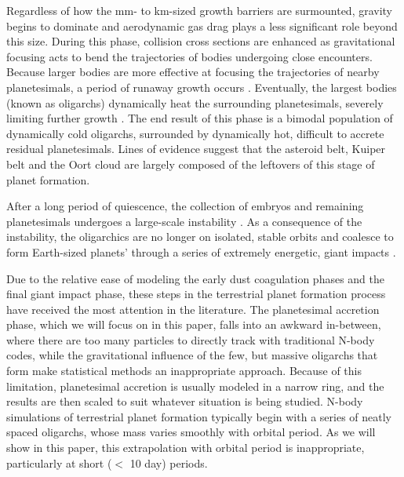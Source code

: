 \documentclass[twocolumn]{aastex63}
\begin{document}
Regardless of how the mm- to km-sized growth barriers are surmounted, gravity begins to dominate and aerodynamic gas drag plays a less significant role beyond this size. During this phase, collision cross sections are enhanced as gravitational focusing \citep{safronov69} acts to bend the trajectories of bodies undergoing close encounters. Because larger bodies are more effective at focusing the trajectories of nearby planetesimals, a period of runaway growth occurs \citep{wetherill89, kokubo96, barnes09}. Eventually, the largest bodies (known as oligarchs) dynamically heat the surrounding planetesimals, severely limiting further growth \citep{kokubo98}. The end result of this phase is a bimodal population of dynamically cold oligarchs, surrounded by dynamically hot, difficult to accrete residual planetesimals. Lines of evidence suggest that the asteroid belt, Kuiper belt and the Oort cloud are largely composed of the leftovers of this stage of planet formation.

After a long period of quiescence, the collection of embryos and
remaining planetesimals undergoes a large-scale instability
\citep{chambers98}.
As a consequence of the instability, the oligarchics are no longer
on isolated, stable orbits and coalesce to form Earth-sized planets'
through a series of extremely energetic, giant 
impacts \citep{kokubo02, raymond05, raymond06}.

Due to the relative ease of modeling the early dust coagulation phases
and the final giant impact phase, these steps in the terrestrial
planet formation process have received the most attention in the
literature. The planetesimal accretion phase, which we will focus on
in this paper, falls into an awkward in-between, where there are too
many particles to directly track with traditional N-body codes, while
the gravitational influence of the few, but massive oligarchs that
form make statistical methods an inappropriate approach. Because of
this limitation, planetesimal accretion is usually modeled in a narrow
ring, and the results are then scaled to suit whatever situation is being studied. N-body simulations of terrestrial planet formation typically begin with a series of neatly spaced oligarchs, whose mass varies smoothly with orbital period. As we will show in this paper, this extrapolation with orbital period is inappropriate, particularly at short ($<$ 10 day) periods.
\end{document}
